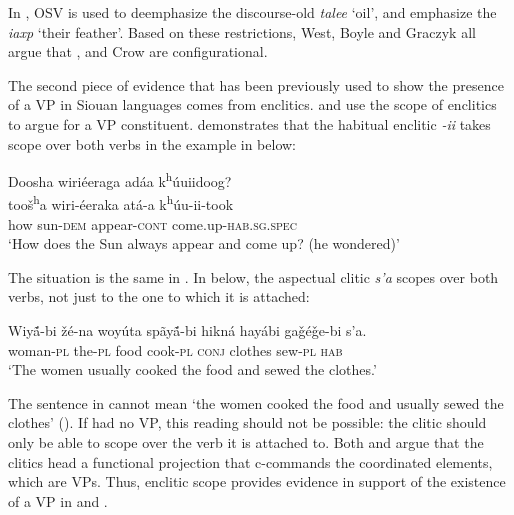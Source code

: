 \documentclass[output=paper]{LSP/langsci}
\begin{document}
In , OSV  is used to deemphasize the discourse-old  \textit{talee} `oil', and emphasize the  \textit{iaxp} `their feather'.  Based on these  restrictions, West, Boyle and Graczyk all argue that ,  and Crow are configurational. 
	
The second piece of evidence that has been previously used to show the presence of a VP in Siouan languages comes from enclitics. \citet{West2003} and \citet{Boyle2007} use the scope of enclitics to argue for a VP constituent. \citet{Boyle2007} demonstrates that the  habitual enclitic \textit{-ii} takes scope over both verbs in the example in  below:

\begin{exe}
\ex\label{ex:jrs:27} 
\glll Doosha	wiri\'eeraga 	ad\'aa 	 k\textsuperscript{h}\'uuiidoog?\\
too\v{s}\textsuperscript{h}a 	wiri-\'eeraka 	at\'a-a k\textsuperscript{h}\'uu-ii-took \\
how 	sun-\textsc{dem} 	appear-\textsc{cont}  come.up-\textsc{hab.sg.spec} \\
\trans `How does the Sun always appear and come up? (he wondered)' \citep[223]{Boyle2007}
\end{exe}

The situation is the same in .  In  below, the aspectual clitic \textit{s'a} scopes over both verbs, not just to the one to which it is attached:

\begin{exe}
\ex\label{ex:jrs:28} \gll Wiy\'{\~a}-bi 		\v{z}\'e-na 	woy\'uta 	sp\~ay\'{\~a}-bi 	hikn\'a 	hay\'abi 		ga\v{g}\'e\v{g}e-bi 	s'a. \\
woman-\textsc{pl} the-\textsc{pl} 	food 	cook-\textsc{pl} \textsc{conj} 	clothes 	sew-\textsc{pl} 	\textsc{hab} \\
\trans `The women usually cooked the food and sewed the clothes.' \citep[39]{West2003}
\end{exe}

The sentence in  cannot mean `the women cooked the food and usually sewed the clothes' (\citealt{West2003}).  If  had no VP, this reading should not be possible: the clitic should only be able to scope over the verb it is attached to. Both \citet{Boyle2007} and \citet{West2003} argue that the clitics head a functional projection that c-commands the coordinated elements, which are VPs.  Thus, enclitic scope provides evidence in support of the existence of a VP in  and .
	
\end{document}
